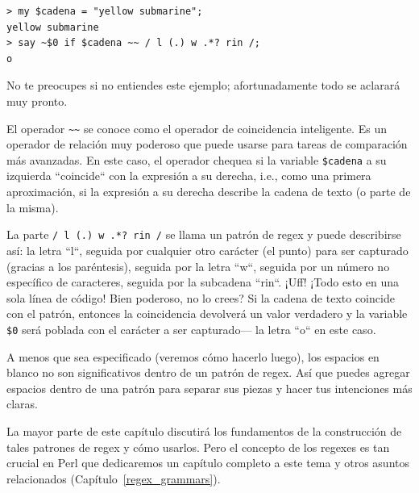 \begin{verbatim}
> my $cadena = "yellow submarine";
yellow submarine
> say ~$0 if $cadena ~~ / l (.) w .*? rin /;
o
\end{verbatim}

No te preocupes si no entiendes este ejemplo;
afortunadamente todo se aclarará muy pronto.

El operador \verb|~~| se conoce como el operador de coincidencia
inteligente. Es un operador de relación muy poderoso que puede
usarse para tareas de comparación más avanzadas. En este caso, 
el operador chequea si la variable {\tt \$cadena} a su izquierda
``coincide`` con la expresión a su derecha, i.e., como una 
primera aproximación, si la expresión a su derecha describe la 
cadena de texto (o parte de la misma).

La parte \verb|/ l (.) w .*? rin /| se llama un patrón de regex y puede
describirse así: la letra ``l``, seguida por cualquier otro carácter (el
punto) para ser capturado (gracias a los paréntesis), seguida por la
letra ``w``, seguida por un número no específico de caracteres,
seguida por la subcadena ``rin``. ¡Uff! ¡Todo esto en una sola línea
de código! Bien poderoso, no lo crees? Si la cadena de texto coincide 
con el patrón, entonces la coincidencia devolverá un valor verdadero y 
la variable \verb|$0| será poblada con el carácter a ser capturado---
la letra ``o`` en este caso.

A menos que sea especificado (veremos cómo hacerlo luego),
los espacios en blanco no son significativos dentro de un 
patrón de regex. Así que puedes agregar espacios dentro de una patrón
para separar sus piezas y hacer tus intenciones más claras.

La mayor parte de este capítulo discutirá los fundamentos de 
la construcción de tales patrones de regex y cómo usarlos. 
Pero el concepto de los regexes es tan crucial en Perl que 
dedicaremos un capítulo completo a este tema y otros asuntos
relacionados (Capítulo~\ref{regex_grammars}).

